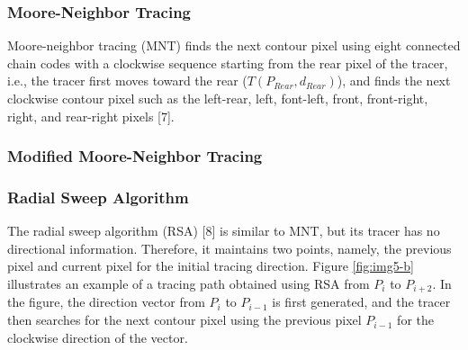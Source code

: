 \subsubsection{Moore-Neighbor Tracing}
Moore-neighbor tracing (MNT) finds the next contour pixel using eight connected chain codes with a clockwise sequence starting from the rear pixel of the tracer, i.e., the tracer first moves toward the rear ($T (P_{Rear}, d_{Rear})$), and finds the next clockwise contour pixel such as the left-rear, left, font-left, front, front-right, right, and rear-right pixels [7]. 

\subsubsection{Modified Moore-Neighbor Tracing}

\subsubsection{Radial Sweep Algorithm}

The radial sweep algorithm (RSA) [8] is similar to MNT, but its tracer has no directional information. Therefore, it maintains two points, namely, the previous pixel and current pixel for the initial tracing direction. Figure \ref{fig:img5-b} illustrates an example of a tracing path obtained using RSA from $P_i$ to $P_{i+2}$. In the figure, the direction vector from $P_i$ to $P_{i-1}$ is first generated, and the tracer then searches for the next contour pixel using the previous pixel $P_{i-1}$ for the clockwise direction of the vector.

